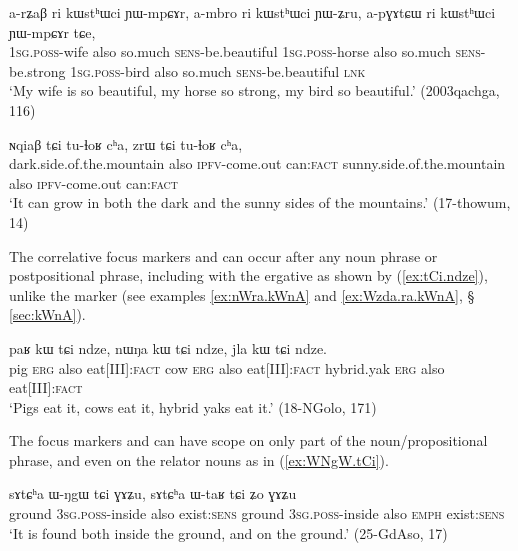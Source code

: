  \begin{exe}
\ex \label{ex:ri.kWsthWci.WWmpCar}
 \gll  a-rʑaβ ri kɯstʰɯci ɲɯ-mpɕɤr, a-mbro ri kɯstʰɯci ɲɯ-ʑru, a-pɣɤtɕɯ ri kɯstʰɯci ɲɯ-mpɕɤr tɕe, \\
 \textsc{1sg}.\textsc{poss}-wife also so.much \textsc{sens}-be.beautiful  \textsc{1sg}.\textsc{poss}-horse also so.much \textsc{sens}-be.strong  \textsc{1sg}.\textsc{poss}-bird also so.much \textsc{sens}-be.beautiful \textsc{lnk} \\
 \glt `My wife is so beautiful, my horse so strong, my bird so beautiful.' (2003qachga, 116)
 \end{exe}
 
  \begin{exe}
\ex \label{ex:tCi.tulhoR.cha}
 \gll  ɴqiaβ tɕi tu-ɬoʁ cʰa, zrɯ tɕi tu-ɬoʁ cʰa, \\
 dark.side.of.the.mountain also \textsc{ipfv}-come.out can:\textsc{fact}   sunny.side.of.the.mountain also \textsc{ipfv}-come.out can:\textsc{fact}  \\
 \glt `It can grow in both the dark and the sunny sides of the mountains.' (17-thowum, 14)
  \end{exe}
  
The correlative focus markers  and  can occur after any noun phrase or postpositional phrase, including with the ergative   as shown by (\ref{ex:tCi.ndze}), unlike the marker  (see examples \ref{ex:nWra.kWnA} and \ref{ex:Wzda.ra.kWnA}, § \ref{sec:kWnA}).
  
  \begin{exe}
\ex \label{ex:tCi.ndze}
 \gll paʁ kɯ tɕi ndze, nɯŋa kɯ tɕi ndze, jla kɯ tɕi ndze.   \\
 pig \textsc{erg} also eat[III]:\textsc{fact}  cow \textsc{erg} also eat[III]:\textsc{fact}  hybrid.yak \textsc{erg} also eat[III]:\textsc{fact}  \\
 \glt `Pigs eat it, cows eat it, hybrid yaks eat it.' (18-NGolo, 171)
  \end{exe}

The focus markers  and  can have scope on only part of the noun/propositional phrase, and even on the relator nouns as in (\ref{ex:WNgW.tCi}).

   \begin{exe}
\ex \label{ex:WNgW.tCi}
 \gll   sɤtɕʰa ɯ-ŋgɯ tɕi ɣɤʑu, sɤtɕʰa ɯ-taʁ tɕi ʑo ɣɤʑu \\
 ground \textsc{3sg}.\textsc{poss}-inside also exist:\textsc{sens}  ground \textsc{3sg}.\textsc{poss}-inside also \textsc{emph} exist:\textsc{sens} \\
 \glt `It is found both inside the ground, and on the ground.' (25-GdAso, 17)
    \end{exe}
    
